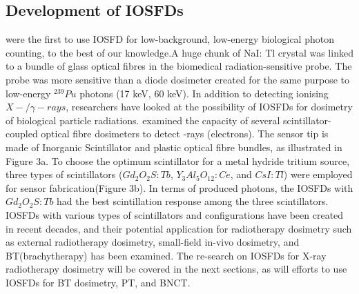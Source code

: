 \documentclass{article}
\begin{document}
\begin{multicols}{2}
\section{Development of IOSFDs}
\citeauthor{swinth1976biomedical} were the first to use IOSFD for low-background, low-energy biological photon counting, to the best of our knowledge.A huge chunk of NaI: Tl crystal was linked to a bundle of glass optical fibres in the biomedical radiation-sensitive probe. The probe was more sensitive than a diode dosimeter created for the same purpose to low-energy $^{239}Pu$ photons (17 keV, 60 keV). In addition to detecting ionising $X-/\gamma-rays$, researchers have looked at the possibility of IOSFDs for dosimetry of biological particle radiations. \citeauthor{jang2011fiber} examined the capacity of several scintillator-coupled optical fibre dosimeters to detect -rays (electrons). The sensor tip is made of Inorganic Scintillator and plastic optical fibre bundles, as illustrated in Figure 3a. To choose the optimum scintillator for a metal hydride tritium source, three types of scintillators ($Gd_2O_2S:Tb$, $Y_3Al_5O_{12}:Ce$, and $CsI:Tl$) were employed for sensor fabrication(Figure 3b). In terms of produced photons, the IOSFDs with $Gd_2O_2S:Tb$ had the best scintillation response among the three scintillators. IOSFDs with various types of scintillators and configurations have been created in recent decades, and their potential application for radiotherapy dosimetry such as external radiotherapy dosimetry, small-field in-vivo dosimetry, and BT(brachytherapy) has been examined. The re-search on IOSFDs for X-ray radiotherapy dosimetry will be covered in the next sections, as will efforts to use IOSFDs for BT dosimetry, PT, and BNCT.
\end{multicols}
\end{document}
